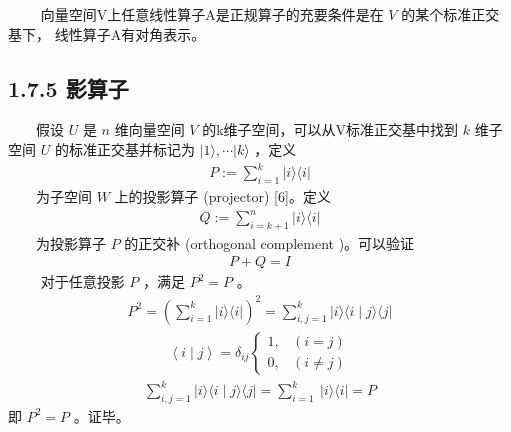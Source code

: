 \documentclass[a4paper,11pt,english]{sphinxmanual}
\begin{document}
\sphinxAtStartPar
​   向量空间V上任意线性算子A是正规算子的充要条件是在  \(V\)  的某个标准正交基下， 线性算子A有对角表示。


\subsection{1.7.5 影算子}
\label{\detokenize{rst/_u9644_u5f551_u91cf_u5b50_u8ba1_u7b97_u6570_u5b66_u57fa_u78405:id7}}
\sphinxAtStartPar
​  假设  \(U\)  是  \(n\)  维向量空间  \(V\)  的k维子空间，可以从V标准正交基中找到  \(k\)  维子空间  \(U\)  的标准正交基并标记为  \(|1\rangle, \cdots|k\rangle\)  ，定义
\begin{equation*}
\begin{split}P:=\sum_{i=1}^{k}|i\rangle\langle i|\end{split}
\end{equation*}
\sphinxAtStartPar
​  为子空间 \(W\) 上的投影算子 (projector) {[}6{]}。定义
\begin{equation*}
\begin{split}Q:=\sum_{i=k+1}^{n}|i\rangle\langle i|\end{split}
\end{equation*}
\sphinxAtStartPar
​  为投影算子 \(P\) 的正交补 (orthogonal complement )。可以验证
\begin{equation*}
\begin{split}P+Q=I\end{split}
\end{equation*}
\sphinxAtStartPar
​   对于任意投影  \(P\)  ，满足  \(P^{2}=P\)  。
\begin{equation*}
\begin{split}P^{2}=\left(\sum_{i=1}^{k}|i\rangle\langle i|\right)^{2}=\sum_{i, j=1}^{k}|i\rangle\langle i \mid j\rangle\langle j|\end{split}
\end{equation*}\begin{equation*}
\begin{split}\left\langle i \mid j\right\rangle=\delta_{i j} \begin{cases}1, & (i=j) \\ 0, & (i \neq j)\end{cases}\end{split}
\end{equation*}\begin{equation*}
\begin{split}\sum_{ i, j=1}^{k}|i\rangle\langle i \mid j\rangle  \langle j |=\sum_{i=1}^{k} \ | i\rangle \langle i|=P\end{split}
\end{equation*}
\sphinxAtStartPar
即  \(P^{2}=P\)  。证毕。
\end{document}
